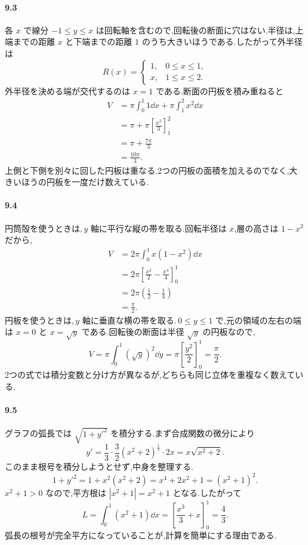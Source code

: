 \paragraph{9.3}
各 $x$ で線分 $-1\le y\le x$ は回転軸を含むので,回転後の断面に穴はない.半径は,上端までの距離 $x$ と下端までの距離 $1$ のうち大きいほうである.したがって外半径は
\[
R(x)=
\begin{cases}
1,&0\le x\le1,\\
x,&1\le x\le2.
\end{cases}
\]
外半径を決める端が交代するのは $x=1$ である.断面の円板を積み重ねると
\[
\begin{aligned}
V&=\pi\int_0^1 1\dd x+\pi\int_1^2 x^2\dd x\\
 &=\pi+\pi\left[\frac{x^3}{3}\right]_1^2\\
 &=\pi+\frac{7\pi}{3}\\
 &=\frac{10\pi}{3}.
\end{aligned}
\]
上側と下側を別々に回した円板は重なる.2つの円板の面積を加えるのでなく,大きいほうの円板を一度だけ数えている.

\paragraph{9.4}
円筒殻を使うときは,\,$y$ 軸に平行な縦の帯を取る.回転半径は $x$,層の高さは $1-x^2$ だから,
\[
\begin{aligned}
V&=2\pi\int_0^1x(1-x^2)\dd x\\
 &=2\pi\left[\frac{x^2}{2}-\frac{x^4}{4}\right]_0^1\\
 &=2\pi\left(\frac12-\frac14\right)\\
 &=\frac{\pi}{2}.
\end{aligned}
\]
円板を使うときは,\,$y$ 軸に垂直な横の帯を取る.\,$0\le y\le1$ で,元の領域の左右の端は $x=0$ と $x=\sqrt y$ である.回転後の断面は半径 $\sqrt y$ の円板なので,
\[
V=\pi\int_0^1(\sqrt y)^2\dd y
 =\pi\left[\frac{y^2}{2}\right]_0^1=\frac{\pi}{2}.
\]
2つの式では積分変数と分け方が異なるが,どちらも同じ立体を重複なく数えている.

\paragraph{9.5}
グラフの弧長では $\sqrt{1+y'^2}$ を積分する.まず合成関数の微分により
\[
y'=\frac13\cdot\frac32(x^2+2)^{\frac12}\cdot2x
 =x\sqrt{x^2+2}.
\]
このまま根号を積分しようとせず,中身を整理する.
\[
1+y'^2=1+x^2(x^2+2)=x^4+2x^2+1=(x^2+1)^2.
\]
$x^2+1>0$ なので,平方根は $|x^2+1|=x^2+1$ となる.したがって
\[
L=\int_0^1(x^2+1)\dd x
 =\left[\frac{x^3}{3}+x\right]_0^1=\frac43.
\]
弧長の根号が完全平方になっていることが,計算を簡単にする理由である.

